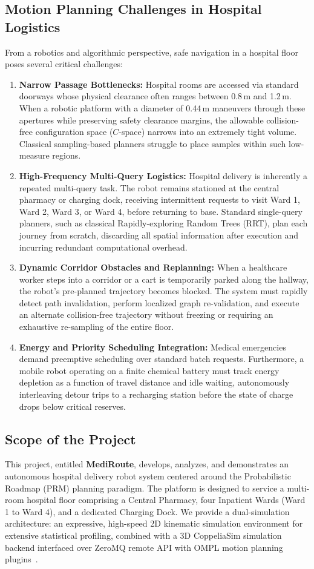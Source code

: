 \documentclass[12pt,a4paper]{article}
\begin{document}
\subsection{Motion Planning Challenges in Hospital Logistics}
From a robotics and algorithmic perspective, safe navigation in a hospital floor poses several critical challenges:
\begin{enumerate}[itemsep=2pt,topsep=2pt]
\item \textbf{Narrow Passage Bottlenecks:} Hospital rooms are accessed via standard doorways whose physical clearance often ranges between 0.8\,m and 1.2\,m. When a robotic platform with a diameter of 0.44\,m maneuvers through these apertures while preserving safety clearance margins, the allowable collision-free configuration space ($C$-space) narrows into an extremely tight volume. Classical sampling-based planners struggle to place samples within such low-measure regions.
\item \textbf{High-Frequency Multi-Query Logistics:} Hospital delivery is inherently a repeated multi-query task. The robot remains stationed at the central pharmacy or charging dock, receiving intermittent requests to visit Ward 1, Ward 2, Ward 3, or Ward 4, before returning to base. Standard single-query planners, such as classical Rapidly-exploring Random Trees (RRT), plan each journey from scratch, discarding all spatial information after execution and incurring redundant computational overhead.
\item \textbf{Dynamic Corridor Obstacles and Replanning:} When a healthcare worker steps into a corridor or a cart is temporarily parked along the hallway, the robot's pre-planned trajectory becomes blocked. The system must rapidly detect path invalidation, perform localized graph re-validation, and execute an alternate collision-free trajectory without freezing or requiring an exhaustive re-sampling of the entire floor.
\item \textbf{Energy and Priority Scheduling Integration:} Medical emergencies demand preemptive scheduling over standard batch requests. Furthermore, a mobile robot operating on a finite chemical battery must track energy depletion as a function of travel distance and idle waiting, autonomously interleaving detour trips to a recharging station before the state of charge drops below critical reserves.
\end{enumerate}

\subsection{Scope of the Project}
This project, entitled \textbf{MediRoute}, develops, analyzes, and demonstrates an autonomous hospital delivery robot system centered around the Probabilistic Roadmap (PRM) planning paradigm. The platform is designed to service a multi-room hospital floor comprising a Central Pharmacy, four Inpatient Wards (Ward 1 to Ward 4), and a dedicated Charging Dock. We provide a dual-simulation architecture: an expressive, high-speed 2D kinematic simulation environment for extensive statistical profiling, combined with a 3D CoppeliaSim simulation backend interfaced over ZeroMQ remote API with OMPL motion planning plugins~\cite{sucan2012}.
\end{document}
